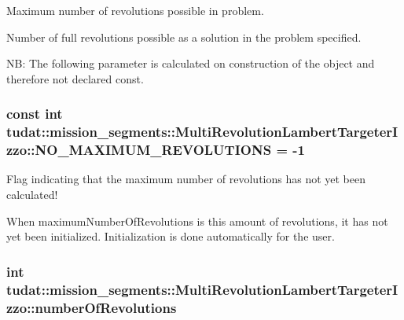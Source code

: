 Maximum number of revolutions possible in problem. 

Number of full revolutions possible as a solution in the problem specified.

NB\+: The following parameter is calculated on construction of the object and therefore not declared const. 
\subsubsection[{\texorpdfstring{N\+O\+\_\+\+M\+A\+X\+I\+M\+U\+M\+\_\+\+R\+E\+V\+O\+L\+U\+T\+I\+O\+NS}{NO_MAXIMUM_REVOLUTIONS}}]{\setlength{\rightskip}{0pt plus 5cm}const int tudat\+::mission\+\_\+segments\+::\+Multi\+Revolution\+Lambert\+Targeter\+Izzo\+::\+N\+O\+\_\+\+M\+A\+X\+I\+M\+U\+M\+\_\+\+R\+E\+V\+O\+L\+U\+T\+I\+O\+NS = -\/1\hspace{0.3cm}{\ttfamily [static]}}\hypertarget{classtudat_1_1mission__segments_1_1MultiRevolutionLambertTargeterIzzo_a13989fb53b66d6f5ddc3eb3283a9dd0d}{}\label{classtudat_1_1mission__segments_1_1MultiRevolutionLambertTargeterIzzo_a13989fb53b66d6f5ddc3eb3283a9dd0d}


Flag indicating that the maximum number of revolutions has not yet been calculated! 

When maximum\+Number\+Of\+Revolutions is this amount of revolutions, it has not yet been initialized. Initialization is done automatically for the user. 
\subsubsection[{\texorpdfstring{number\+Of\+Revolutions}{numberOfRevolutions}}]{\setlength{\rightskip}{0pt plus 5cm}int tudat\+::mission\+\_\+segments\+::\+Multi\+Revolution\+Lambert\+Targeter\+Izzo\+::number\+Of\+Revolutions\hspace{0.3cm}{\ttfamily [protected]}}\hypertarget{classtudat_1_1mission__segments_1_1MultiRevolutionLambertTargeterIzzo_abc7999d932142238f64050ec3c2d4d85}{}\label{classtudat_1_1mission__segments_1_1MultiRevolutionLambertTargeterIzzo_abc7999d932142238f64050ec3c2d4d85}


